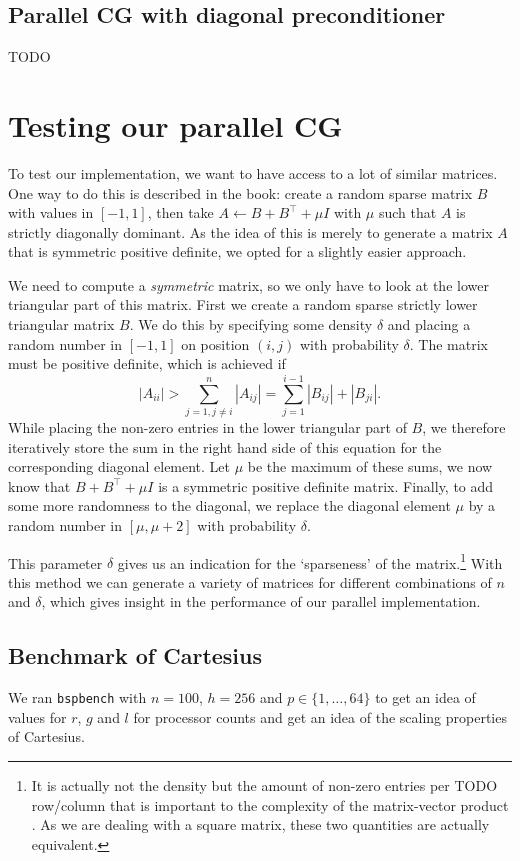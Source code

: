 \documentclass[11pt]{amsart}
\theoremstyle{definition}
\begin{document}
\subsection{Parallel CG with diagonal preconditioner}
TODO

\section{Testing our parallel CG}
To test our implementation, we want to have access to a lot of similar matrices. One way to do this is described in the book: create a random sparse matrix $B$ with values in $[-1,1]$, then take $A \gets B + B^\top + \mu I$ with $\mu$ such that $A$ is strictly diagonally dominant. As the idea of this is merely to generate a matrix $A$ that is symmetric positive definite, we opted for a slightly easier approach. 

We need to compute a \emph{symmetric} matrix, so we only have to look at the lower triangular part of this matrix. First we create a 
random sparse strictly lower triangular matrix $B$. We do this by specifying some
density $\delta$ and placing a random number in $[-1,1]$ on position $(i,j)$ with probability $\delta$. The matrix
must be positive definite, which is achieved \cite[Ex.~24.2]{trefbau} if
\[
  |A_{ii}| > \sum_{j=1, j\ne i}^n |A_{ij}|= \sum_{j=1}^{i-1} |B_{ij}| + |B_{ji}|.
\]
While placing the non-zero entries in the lower triangular part of $B$, we therefore iteratively store the sum in the right hand side of this equation for the
corresponding diagonal element. Let $\mu$ be the maximum of these sums, we now know that $B + B^\top + \mu I$ is a symmetric
positive definite matrix. Finally, to add some more randomness to the diagonal, we replace the diagonal element $\mu$ by a random number in $[\mu, \mu + 2]$ with probability $\delta$.

This parameter $\delta$ gives us an indication for the `sparseness' of the matrix.\footnote{It is actually not the density but the amount of non-zero entries per TODO row/column that is important to the complexity of the matrix-vector product \cite[p.~178]{biss04}. As we are dealing with a square matrix, these two quantities are actually equivalent.} With this method we can generate a variety of matrices
for different combinations of $n$ and $\delta$, which gives insight in the performance of our parallel implementation.

\subsection{Benchmark of Cartesius}
\label{sec:cart}
We ran \texttt{bspbench} with $n=100$, $h=256$ and $p \in \{1, \ldots, 64\}$ to get an idea of values for $r$, $g$ and $l$ for processor counts and get an idea of the scaling properties of Cartesius.
\end{document}
